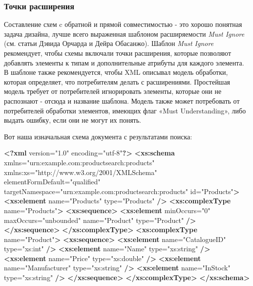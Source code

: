 \documentclass[11pt]{article}
\newenvironment{Shaded}{}{}
\newcommand{\KeywordTok}[1]{\textcolor[rgb]{0.00,0.44,0.13}{\textbf{{#1}}}}
\newcommand{\StringTok}[1]{\textcolor[rgb]{0.25,0.44,0.63}{{#1}}}
\newcommand{\OtherTok}[1]{\textcolor[rgb]{0.00,0.44,0.13}{{#1}}}
\newcommand{\NormalTok}[1]{{#1}}
\begin{document}
\subsubsection{Точки
расширения}\label{ux442ux43eux447ux43aux438-ux440ux430ux441ux448ux438ux440ux435ux43dux438ux44f}

Составление схем c обратной и прямой совместимостью - это хорошо
понятная задача дизайна, лучше всего выраженная шаблоном расширяемости
\emph{Must Ignore} (см. статьи Дэвида Орчарда и Дейра Обасанжо). Шаблон
\emph{Must Ignore} рекомендует, чтобы схемы включали точки расширения,
которые позволяют добавлять элементы к типам и дополнительные атрибуты
для каждого элемента. В шаблоне также рекомендуется, чтобы XML описывал
модель обработки, которая определяет, что потребителям делать с
расширениями. Простейшая модель требует от потребителей игнорировать
элементы, которые они не распознают - отсюда и название шаблона. Модель
также может потребовать от потребителей обработки элементов, имеющих
флаг «Must Understanding», либо выдать ошибку, если они не могут их
понять.

Вот наша изначальная схема документа с результатами поиска:

\begin{Shaded}
\begin{Highlighting}[]
\KeywordTok{<?xml}\NormalTok{ version="1.0" encoding="utf-8"}\KeywordTok{?>}
\KeywordTok{<xs:schema}\OtherTok{ xmlns=}\StringTok{"urn:example.com:productsearch:products"} 
\OtherTok{  xmlns:xs=}\StringTok{"http://www.w3.org/2001/XMLSchema"}
\OtherTok{  elementFormDefault=}\StringTok{"qualified"} 
\OtherTok{  targetNamespace=}\StringTok{"urn:example.com:productsearch:products"} 
\OtherTok{  id=}\StringTok{"Products"}\KeywordTok{>}
  \KeywordTok{<xs:element}\OtherTok{ name=}\StringTok{"Products"}\OtherTok{ type=}\StringTok{"Products"} \KeywordTok{/>}
  \KeywordTok{<xs:complexType}\OtherTok{ name=}\StringTok{"Products"}\KeywordTok{>}
    \KeywordTok{<xs:sequence>}
      \KeywordTok{<xs:element}\OtherTok{ minOccurs=}\StringTok{"0"}\OtherTok{ maxOccurs=}\StringTok{"unbounded"}\OtherTok{ name=}\StringTok{"Product"}\OtherTok{ type=}\StringTok{"Product"} \KeywordTok{/>}
    \KeywordTok{</xs:sequence>}
  \KeywordTok{</xs:complexType>}
  \KeywordTok{<xs:complexType}\OtherTok{ name=}\StringTok{"Product"}\KeywordTok{>}
    \KeywordTok{<xs:sequence>}
      \KeywordTok{<xs:element}\OtherTok{ name=}\StringTok{"CatalogueID"}\OtherTok{ type=}\StringTok{"xs:int"} \KeywordTok{/>}
      \KeywordTok{<xs:element}\OtherTok{ name=}\StringTok{"Name"}\OtherTok{ type=}\StringTok{"xs:string"} \KeywordTok{/>}
      \KeywordTok{<xs:element}\OtherTok{ name=}\StringTok{"Price"}\OtherTok{ type=}\StringTok{"xs:double"} \KeywordTok{/>}
      \KeywordTok{<xs:element}\OtherTok{ name=}\StringTok{"Manufacturer"}\OtherTok{ type=}\StringTok{"xs:string"} \KeywordTok{/>}
      \KeywordTok{<xs:element}\OtherTok{ name=}\StringTok{"InStock"}\OtherTok{ type=}\StringTok{"xs:string"} \KeywordTok{/>}
    \KeywordTok{</xs:sequence>}
  \KeywordTok{</xs:complexType>}
\KeywordTok{</xs:schema>}
\end{Highlighting}
\end{Shaded}
\end{document}
